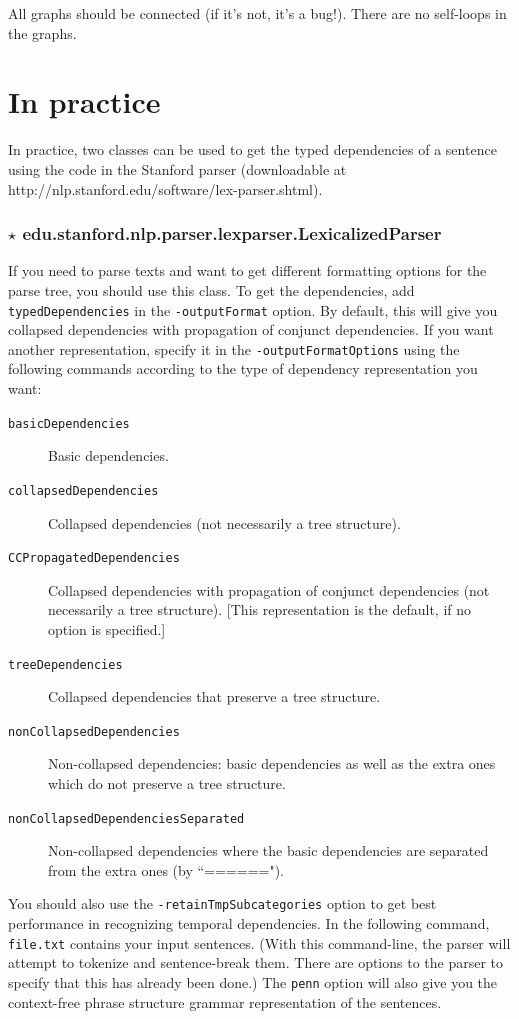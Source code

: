 \documentclass[11pt,letter]{article}
\begin{document}
All graphs should be connected (if it's not, it's a bug!).
There are no self-loops in the graphs.


\section{In practice}\label{in_practice}

In practice, two classes can be used to get the typed dependencies of a sentence using the code in the Stanford parser (downloadable at \textsf{http://nlp.stanford.edu/software/lex-parser.shtml}).

\subsubsection*{$\star$ \textbf{edu.stanford.nlp.parser.lexparser.LexicalizedParser}}

If you need to parse texts and want to get different formatting options for the parse tree, you should use this class. To get the dependencies, add \texttt{typedDependencies} in the \texttt{-outputFormat} option. By default, this will give you collapsed dependencies with propagation of conjunct dependencies. If you want another representation, specify it in the \texttt{-outputFormatOptions} using the following commands according to the type of dependency representation you want:

\begin{description}
\item[\texttt{basicDependencies}] Basic dependencies.
\item[\texttt{collapsedDependencies}] Collapsed dependencies (not necessarily a tree structure).
\item[\texttt{CCPropagatedDependencies}] Collapsed dependencies with propagation of conjunct
dependencies (not necessarily a tree structure).  [This representation is the default, if no option is specified.]
\item[\texttt{treeDependencies}] Collapsed dependencies that preserve a tree structure.
\item[\texttt{nonCollapsedDependencies}]  Non-collapsed dependencies: basic dependencies as well as
 the extra ones which do not preserve a tree structure.
\item[\texttt{nonCollapsedDependenciesSeparated}] Non-collapsed dependencies where the basic dependencies
are separated from the extra ones (by ``======").
\end{description}

\noindent You should also use the \texttt{-retainTmpSubcategories}
option to get best performance in recognizing temporal
dependencies. In the following command, \texttt{file.txt} contains
your input sentences.  (With this command-line, the parser will
attempt to tokenize and sentence-break them. There are options to the
parser to specify that this has already been done.) The \texttt{penn}
option will also give you the context-free phrase structure grammar
representation of the sentences.
\end{document}
